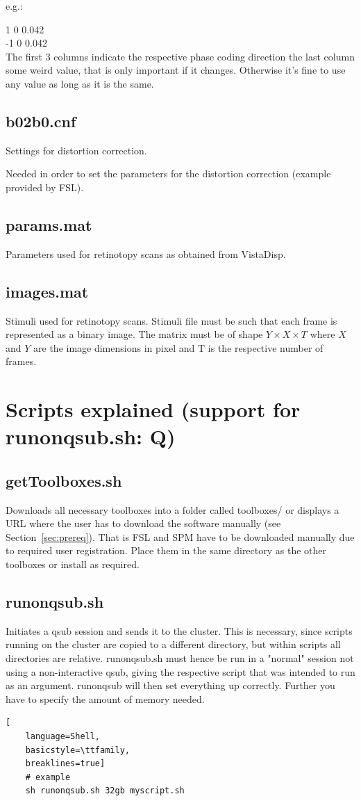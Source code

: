 \documentclass[12pt,a4paper]{scrartcl}
\begin{document}
\noindent e.g.:

 1 0 0.042\\
 -1 0 0.042\\

The first 3 columns indicate the respective phase coding direction the last column some weird value, that is only important if it changes. Otherwise it's fine to use any value as long as it is the same.

\subsection{b02b0.cnf}
Settings for distortion correction.

Needed in order to set the parameters for the distortion correction (example provided by FSL).

\subsection{params.mat}
Parameters used for retinotopy scans as obtained from VistaDisp.

\subsection{images.mat}
Stimuli used for retinotopy scans. Stimuli file must be such that each frame is represented as a binary image. The matrix must be of shape $Y \times X \times T$ where $X$ and $Y$ are the image dimensions in pixel and T is the respective number of frames.

\section{Scripts explained (support for runonqsub.sh: Q)}
\subsection{getToolboxes.sh}
\label{sec:getTools}
Downloads all necessary toolboxes into a folder called toolboxes/ or displays a URL where the user has to download the software manually (see Section~\ref{sec:prereq}). That is FSL and SPM have to be downloaded manually due to required user registration. Place them in the same directory as the other toolboxes or install as required.

\subsection{runonqsub.sh}
Initiates a qsub session and sends it to the cluster. This is necessary, since scripts running on the cluster are copied to a different directory, but within scripts all directories are relative. runonqsub.sh must hence be run in a "normal" session not using a non-interactive qsub, giving the respective script that was intended to run as an argument. runonqsub will then set everything up correctly. Further you have to specify the amount of memory needed.
\begin{lstlisting}[
    language=Shell,
    basicstyle=\ttfamily,
    breaklines=true]
    # example
    sh runonqsub.sh 32gb myscript.sh
\end{lstlisting}
\end{document}
